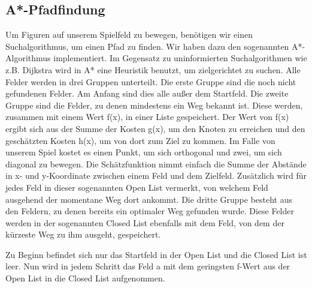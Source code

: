 \documentclass[extern,palatino]{cgBA}
\begin{document}
\subsection{A*-Pfadfindung}\label{Pfadfindung}
Um Figuren auf unserem Spielfeld zu bewegen, benötigen wir einen Suchalgorithmus, um einen Pfad zu finden. Wir haben dazu den sogenannten A*-Algorithmus implementiert. Im Gegensatz zu uninformierten Suchalgorithmen wie z.B. Dijkstra wird in A* eine Heuristik benutzt, um zielgerichtet zu suchen. Alle Felder werden in drei Gruppen unterteilt. Die erste Gruppe sind die noch nicht gefundenen Felder. Am Anfang sind dies alle außer dem Startfeld. Die zweite Gruppe sind die Felder, zu denen mindestens ein Weg bekannt ist. Diese werden, zusammen mit einem Wert f(x), in einer Liste gespeichert. Der Wert von f(x) ergibt sich aus der Summe der Kosten g(x), um den Knoten zu erreichen und den geschätzten Kosten h(x), um von dort zum Ziel zu kommen. Im Falle von unserem Spiel kostet es einen Punkt, um sich orthogonal und zwei, um sich diagonal zu bewegen. Die Schätzfunktion nimmt einfach die Summe der Abstände in x- und y-Koordinate zwischen einem Feld und dem Zielfeld. Zusätzlich wird für jedes Feld in dieser sogenannten Open List vermerkt, von welchem Feld ausgehend der momentane Weg dort ankommt. Die dritte Gruppe besteht aus den Feldern, zu denen bereits ein optimaler Weg gefunden wurde. Diese Felder werden in der sogenannten Closed List ebenfalls mit dem Feld, von dem der kürzeste Weg zu ihm ausgeht, gespeichert.

Zu Beginn befindet sich nur das Startfeld in der Open List und die Closed List ist leer. Nun wird in jedem Schritt das Feld a mit dem geringsten f-Wert aus der Open List in die Closed List aufgenommen. 
\end{document}
